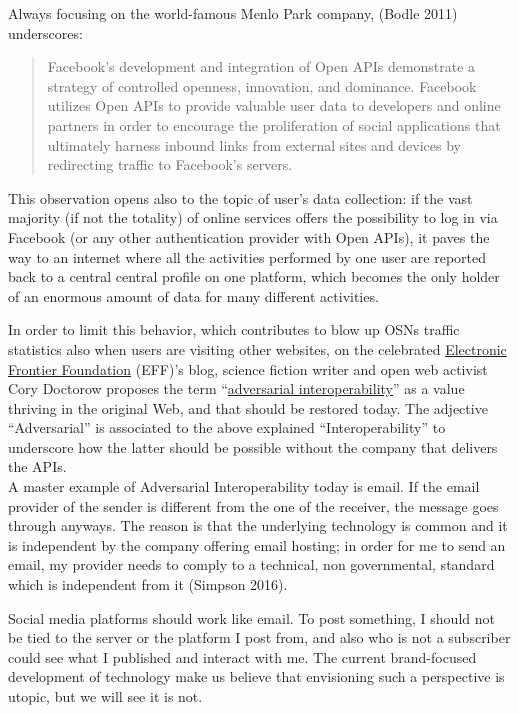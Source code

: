 \documentclass[
  a4paper,
]{book}
\begin{document}
Always focusing on the world-famous Menlo Park company, {(Bodle 2011)} underscores:

\begin{quote}
Facebook's development and integration of Open APIs demonstrate a strategy of controlled openness, innovation, and dominance. Facebook utilizes Open APIs to provide valuable user data to developers and online partners in order to encourage the proliferation of social applications that ultimately harness inbound links from external sites and devices by redirecting traffic to Facebook's servers.
\end{quote}

This observation opens also to the topic of user's data collection: if the vast majority (if not the totality) of online services offers the possibility to log in via Facebook (or any other authentication provider with Open APIs), it paves the way to an internet where all the activities performed by one user are reported back to a central central profile on one platform, which becomes the only holder of an enormous amount of data for many different activities.

In order to limit this behavior, which contributes to blow up OSNs traffic statistics also when users are visiting other websites, on the celebrated \href{https://eff.org}{Electronic Frontier Foundation} (EFF)'s blog, science fiction writer and open web activist Cory Doctorow proposes the term ``\href{https://www.eff.org/deeplinks/2019/10/adversarial-interoperability}{adversarial interoperability}'' as a value thriving in the original Web, and that should be restored today. The adjective ``Adversarial'' is associated to the above explained ``Interoperability'' to underscore how the latter should be possible without the company that delivers the APIs.\\
A master example of Adversarial Interoperability today is email. If the email provider of the sender is different from the one of the receiver, the message goes through anyways. The reason is that the underlying technology is common and it is independent by the company offering email hosting; in order for me to send an email, my provider needs to comply to a technical, non governmental, standard which is independent from it {(Simpson 2016)}.

Social media platforms should work like email. To post something, I should not be tied to the server or the platform I post from, and also who is not a subscriber could see what I published and interact with me. The current brand-focused development of technology make us believe that envisioning such a perspective is utopic, but we will see it is not.
\end{document}
